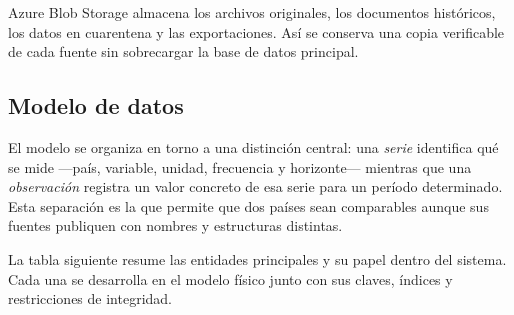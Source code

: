 \documentclass[11pt,a4paper]{article}
\begin{document}
Azure Blob Storage almacena los archivos originales, los documentos
hist\'oricos, los datos en cuarentena y las exportaciones. As\'i se conserva una
copia verificable de cada fuente sin sobrecargar la base de datos principal.

\subsection{Modelo de datos}

El modelo se organiza en torno a una distinci\'on central: una \emph{serie}
identifica qu\'e se mide ---pa\'is, variable, unidad, frecuencia y horizonte---
mientras que una \emph{observaci\'on} registra un valor concreto de esa serie
para un per\'iodo determinado. Esta separaci\'on es la que permite que dos
pa\'ises sean comparables aunque sus fuentes publiquen con nombres y estructuras
distintas.

La tabla siguiente resume las entidades principales y su papel dentro del
sistema. Cada una se desarrolla en el modelo f\'isico junto con sus claves,
\'indices y restricciones de integridad.
\end{document}
